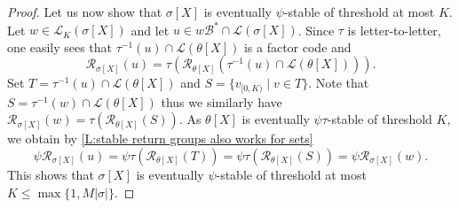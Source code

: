 \documentclass[10pt,a4paper]{amsart}
\newcommand*{\cB}{\mathcal{B}}
\newcommand*{\lang}{\mathcal{L}}
\newcommand*{\ret}{\mathcal{R}}
\begin{document}
\begin{proof}
    Let us now show that $\sigma[X]$ is eventually $\psi$-stable of threshold at most $K$. Let $w \in \lang_K(\sigma[X])$ and let $u \in w\cB^* \cap \lang(\sigma[X])$. Since $\tau$ is letter-to-letter, one easily sees that $\tau^{-1}(u)\cap\lang(\theta[X])$ is a factor code and 
    \[
        \ret_{\sigma[X]}(u) = \tau(\ret_{\theta[X]}(\tau^{-1}(u)\cap\lang(\theta[X]))).
    \]
    Set $T = \tau^{-1}(u)\cap\lang(\theta[X])$ and $S = \{v_{[0,K)} \mid v \in T\}$. Note that $S = \tau^{-1}(w)\cap\lang(\theta[X])$ thus we similarly have $\ret_{\sigma[X]}(w) = \tau(\ret_{\theta[X]}(S))$. As $\theta[X]$ is eventually $\psi\tau$-stable of threshold $K$, we obtain by \cref{L:stable return groups also works for sets}
    \[
        \psi\ret_{\sigma[X]}(u) = \psi\tau(\ret_{\theta[X]}(T)) = \psi\tau(\ret_{\theta[X]}(S)) = \psi\ret_{\sigma[X]}(w).
    \]
    This shows that $\sigma[X]$ is eventually $\psi$-stable of threshold at most $K \leq \max\{1,M|\sigma|\}$.
\end{proof}
\end{document}
